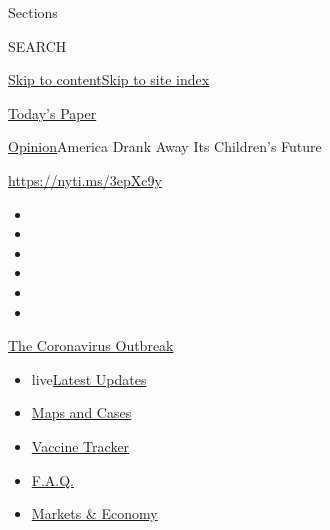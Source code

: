 Sections

SEARCH

\protect\hyperlink{site-content}{Skip to
content}\protect\hyperlink{site-index}{Skip to site index}

\href{https://myaccount.nytimes.com/auth/login?response_type=cookie\&client_id=vi}{}

\href{https://www.nytimes.com/section/todayspaper}{Today's Paper}

\href{/section/opinion}{Opinion}\textbar{}America Drank Away Its
Children's Future

\href{https://nyti.ms/3epXc9y}{https://nyti.ms/3epXc9y}

\begin{itemize}
\item
\item
\item
\item
\item
\item
\end{itemize}

\href{https://www.nytimes.com/news-event/coronavirus?action=click\&pgtype=Article\&state=default\&region=TOP_BANNER\&context=storylines_menu}{The
Coronavirus Outbreak}

\begin{itemize}
\tightlist
\item
  live\href{https://www.nytimes.com/2020/08/08/world/coronavirus-updates.html?action=click\&pgtype=Article\&state=default\&region=TOP_BANNER\&context=storylines_menu}{Latest
  Updates}
\item
  \href{https://www.nytimes.com/interactive/2020/us/coronavirus-us-cases.html?action=click\&pgtype=Article\&state=default\&region=TOP_BANNER\&context=storylines_menu}{Maps
  and Cases}
\item
  \href{https://www.nytimes.com/interactive/2020/science/coronavirus-vaccine-tracker.html?action=click\&pgtype=Article\&state=default\&region=TOP_BANNER\&context=storylines_menu}{Vaccine
  Tracker}
\item
  \href{https://www.nytimes.com/interactive/2020/world/coronavirus-tips-advice.html?action=click\&pgtype=Article\&state=default\&region=TOP_BANNER\&context=storylines_menu}{F.A.Q.}
\item
  \href{https://www.nytimes.com/live/2020/08/07/business/stock-market-today-coronavirus?action=click\&pgtype=Article\&state=default\&region=TOP_BANNER\&context=storylines_menu}{Markets
  \& Economy}
\end{itemize}

